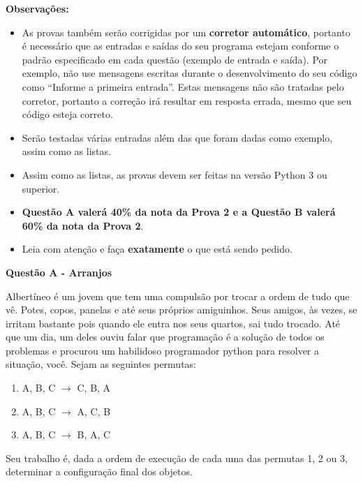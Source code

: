 \documentclass[a4paper, 12pt]{article}
\begin{document}
\textbf{{\large Observações:}}
\begin{itemize}
	\item As provas também serão corrigidas por um \textbf{corretor automático}, portanto é necessário que as entradas e saídas do seu programa estejam conforme o padrão especificado em cada questão (exemplo de entrada e saída). Por exemplo, não use mensagens escritas durante o desenvolvimento do seu código como “Informe a primeira entrada”. Estas mensagens não são tratadas pelo corretor, portanto a correção irá resultar em resposta errada, mesmo que seu código esteja correto.
	\item Serão testadas várias entradas além das que foram dadas como exemplo, assim como as listas.
	\item Assim como as listas, as provas devem ser feitas na versão Python 3 ou superior.
	\item \textbf{Questão A valerá 40\% da nota da Prova 2 e a Questão B valerá 60\% da nota da Prova 2}.
	\item Leia com atenção e faça \textbf{exatamente} o que está sendo pedido.
\end{itemize}
\newpage %
\begin{center}
\textbf{{\Large Questão A - Arranjos}}
\end{center}
\vspace{5pt}
Albertíneo é um jovem que tem uma compulsão por trocar a ordem de tudo
que vê. Potes, copos, panelas e até seus próprios amiguinhos. \newline \newline
Seus amigos, às vezes, se irritam bastante pois quando ele entra nos seus
quartos, sai tudo trocado. Até que um dia, um deles ouviu falar que
programação é a solução de todos os problemas e procurou um habilidoso
programador python para resolver a situação, você. \newline \newline
Sejam as seguintes permutas:
\begin{enumerate}
\item A, B, C $\longrightarrow$ C, B, A
\item A, B, C $\longrightarrow$ A, C, B
\item A, B, C $\longrightarrow$ B, A, C
\end{enumerate}
Seu trabalho é, dada a ordem de execução de cada uma das permutas 1, 2 ou 3, determinar a configuração final dos objetos.
\newline \newline
\end{document}
